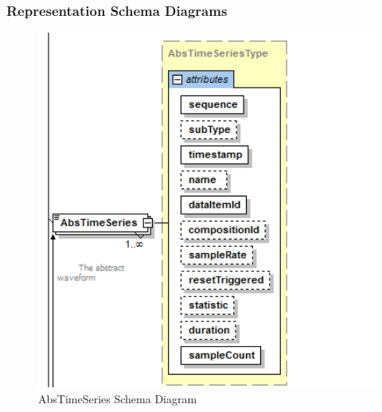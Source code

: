 \FloatBarrier


\subsubsection{Representation Schema Diagrams}
\label{sec:Representation Schema Diagrams}

\begin{figure}[ht]
  \centering
    \includegraphics[width=1.0\textwidth]{figures/AbsTimeSeries Schema.png}
  \caption{AbsTimeSeries Schema Diagram}
  \label{fig:AbsTimeSeries Schema Diagram}
\end{figure}

\FloatBarrier


